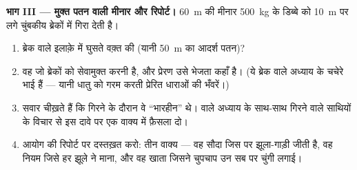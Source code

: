 \begin{problem}
\medskip\noindent\textbf{भाग III --- मुक्त पतन वाली मीनार और
रिपोर्ट।}
\qty{60}{m} की मीनार \qty{500}{kg} के डिब्बे को \qty{10}{m} पर लगे
चुंबकीय ब्रेकों में गिरा देती है।
\begin{enumerate}[resume]
  \item ब्रेक वाले इलाक़े में घुसते वक़्त की  (यानी \qty{50}{m} का
        आदर्श पतन)?
  \item वह  जो ब्रेकों को सेवामुक्त करनी है, और प्रेरण उसे भेजता
        कहाँ है। (ये ब्रेक  वाले अध्याय के चचेरे भाई
        हैं --- यानी धातु को गरम करती प्रेरित धाराओं की भँवरें।)
  \item सवार चीख़ते हैं कि गिरने के दौरान वे ``भारहीन'' थे।
         वाले अध्याय के साथ-साथ गिरने वाले साथियों के
        विचार से इस दावे पर एक वाक्य में फ़ैसला दो।
  \item आयोग की रिपोर्ट पर दस्तख़त करो: तीन वाक्य --- वह सौदा जिस पर
        झूला-गाड़ी जीती है, वह नियम जिसे हर झूले ने माना, और वह खाता
        जिसने चुपचाप उन सब पर चुंगी लगाई।
\end{enumerate}
\end{problem}
